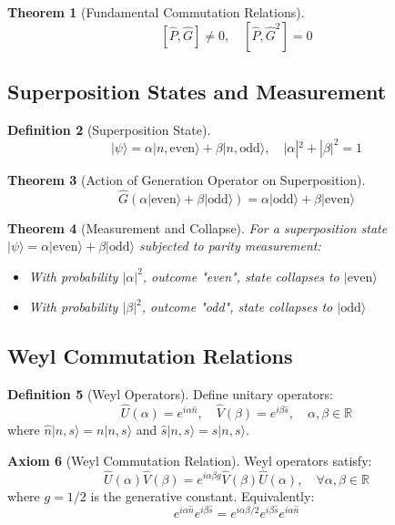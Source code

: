 \documentclass[12pt]{article}
\newtheorem{theorem}{Theorem}[section]
\theoremstyle{definition}
\newtheorem{definition}[theorem]{Definition}
\newtheorem{axiom}[theorem]{Axiom}
\newcommand{\R}{\mathbb{R}}
\begin{document}
\begin{theorem}[Fundamental Commutation Relations]
\[
[\hat{P}, \hat{G}] \neq 0,\quad [\hat{P}, \hat{G}^2] = 0
\]
\end{theorem}

\subsection{Superposition States and Measurement}

\begin{definition}[Superposition State]
\[
|\psi\rangle = \alpha|n,\text{even}\rangle + \beta|n,\text{odd}\rangle,\quad |\alpha|^2 + |\beta|^2 = 1
\]
\end{definition}

\begin{theorem}[Action of Generation Operator on Superposition]
\[
\hat{G}(\alpha|\text{even}\rangle + \beta|\text{odd}\rangle) = \alpha|\text{odd}\rangle + \beta|\text{even}\rangle
\]
\end{theorem}

\begin{theorem}[Measurement and Collapse]
For a superposition state \(|\psi\rangle = \alpha|\text{even}\rangle + \beta|\text{odd}\rangle\) subjected to parity measurement:
\begin{itemize}
    \item With probability \(|\alpha|^2\), outcome "even", state collapses to \(|\text{even}\rangle\)
    \item With probability \(|\beta|^2\), outcome "odd", state collapses to \(|\text{odd}\rangle\)
\end{itemize}
\end{theorem}

\subsection{Weyl Commutation Relations}

\begin{definition}[Weyl Operators]
Define unitary operators:
\[
\hat{U}(\alpha) = e^{i\alpha\hat{n}},\quad \hat{V}(\beta) = e^{i\beta\hat{s}},\quad \alpha,\beta \in \R
\]
where \(\hat{n}|n,s\rangle = n|n,s\rangle\) and \(\hat{s}|n,s\rangle = s|n,s\rangle\).
\end{definition}

\begin{axiom}[Weyl Commutation Relation]
Weyl operators satisfy:
\[
\hat{U}(\alpha)\hat{V}(\beta) = e^{i\alpha\beta g} \hat{V}(\beta)\hat{U}(\alpha),\quad \forall \alpha,\beta \in \R
\]
where \(g = 1/2\) is the generative constant. Equivalently:
\[
\boxed{e^{i\alpha\hat{n}} e^{i\beta\hat{s}} = e^{i\alpha\beta/2} e^{i\beta\hat{s}} e^{i\alpha\hat{n}}}
\]
\end{axiom}
\end{document}
